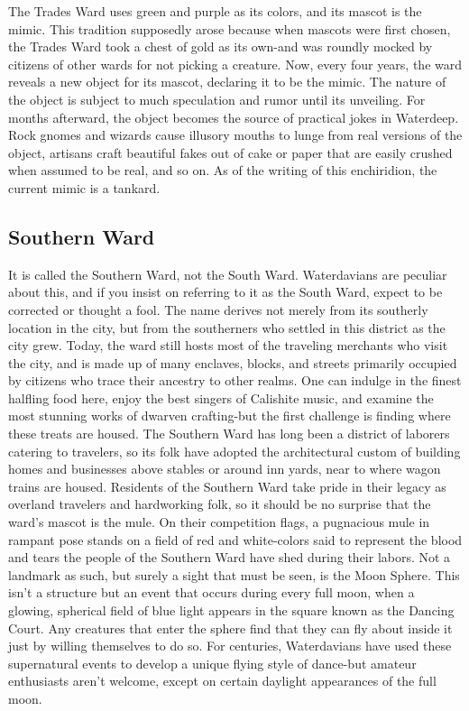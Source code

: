 \documentclass[10pt,a4paper,twoside,twocolumn,openany,nodeprecatedcode]{dndbook}
\begin{document}
The Trades Ward uses green and purple as its colors, and its mascot is the mimic. This tradition supposedly arose because when mascots were first chosen, the Trades Ward took a chest of gold as its own-and was roundly mocked by citizens of other wards for not picking a creature. Now, every four years, the ward reveals a new object for its mascot, declaring it to be the mimic. The nature of the object is subject to much speculation and rumor until its unveiling. For months afterward, the object becomes the source of practical jokes in Waterdeep. Rock gnomes and wizards cause illusory mouths to lunge from real versions of the object, artisans craft beautiful fakes out of cake or paper that are easily crushed when assumed to be real, and so on. As of the writing of this enchiridion, the current mimic is a tankard.
\subsection{Southern Ward}
It is called the Southern Ward, not the South Ward. Waterdavians are peculiar about this, and if you insist on referring to it as the South Ward, expect to be corrected or thought a fool. The name derives not merely from its southerly location in the city, but from the southerners who settled in this district as the city grew. Today, the ward still hosts most of the traveling merchants who visit the city, and is made up of many enclaves, blocks, and streets primarily occupied by citizens who trace their ancestry to other realms.
One can indulge in the finest halfling food here, enjoy the best singers of Calishite music, and examine the most stunning works of dwarven crafting-but the first challenge is finding where these treats are housed. The Southern Ward has long been a district of laborers catering to travelers, so its folk have adopted the architectural custom of building homes and businesses above stables or around inn yards, near to where wagon trains are housed.
Residents of the Southern Ward take pride in their legacy as overland travelers and hardworking folk, so it should be no surprise that the ward's mascot is the mule. On their competition flags, a pugnacious mule in rampant pose stands on a field of red and white-colors said to represent the blood and tears the people of the Southern Ward have shed during their labors.
Not a landmark as such, but surely a sight that must be seen, is the Moon Sphere. This isn't a structure but an event that occurs during every full moon, when a glowing, spherical field of blue light appears in the square known as the Dancing Court. Any creatures that enter the sphere find that they can fly about inside it just by willing themselves to do so. For centuries, Waterdavians have used these supernatural events to develop a unique flying style of dance-but amateur enthusiasts aren't welcome, except on certain daylight appearances of the full moon.
\end{document}
